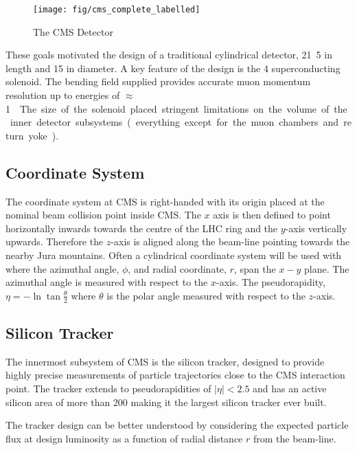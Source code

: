 \begin{figure}
\texttt{[image: fig/cms\_complete\_labelled]}
\caption{The CMS Detector}
\end{figure}

These goals motivated the design of a traditional cylindrical detector,
\unit{21.5}{\metre} in length and \unit{15}{\metre} in diameter. A key feature
of the design is the \unit{4}{\tesla} superconducting solenoid. The bending
field supplied provides accurate muon momentum resolution up to energies of
\unit{$\approx$ 1}{\TeV}. The size of the solenoid placed stringent
limitations on the volume of the inner detector subsystems (everything except
for the muon chambers and return yoke).

\subsection{Coordinate System}
The coordinate system at \ac{CMS} is right-handed with its origin placed at the
nominal beam collision point inside \ac{CMS}. The $x$ axis is then defined to
point horizontally inwards towards the centre of the \ac{LHC} ring and the
$y$-axis vertically upwards. Therefore the $z$-axis is aligned along the
beam-line pointing towards the nearby Jura mountains. Often a cylindrical
coordinate system will be used with where the azimuthal angle, $\phi$, and
radial coordinate, $r$, span the $x-y$ plane. The azimuthal angle is measured
with respect to the $x$-axis. The pseudorapidity, $\eta = - \ln \tan
\frac{\theta}{2}$ where $\theta$ is the polar angle measured with respect to the
$z$-axis.

\subsection{Silicon Tracker}
The innermost subsystem of \ac{CMS} is the silicon tracker, designed to provide
highly precise measurements of particle trajectories close to the CMS
interaction point. The tracker extends to pseudorapidities of $|\eta|<2.5$ and
has an active silicon area of more than \unit{200}{\metre\squared} making it the
largest silicon tracker ever built.

The tracker design can be better understood by considering the expected particle
flux at design luminosity as a function of radial distance $r$ from the
beam-line.


